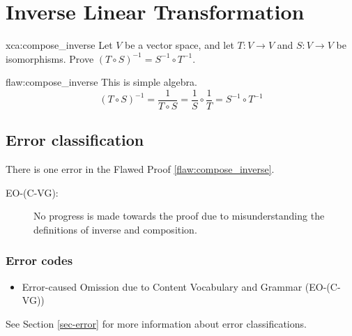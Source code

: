 \section{Inverse Linear Transformation}

\begin{xca}{xca:compose_inverse}
Let $V$ be a vector space, and let $T: V \to V$ and $S: V \to V$ be isomorphisms. Prove $(T \circ S)^{-1} = S^{-1} \circ T^{-1}$.

\end{xca}

\begin{flaw}{flaw:compose_inverse} %
This is simple algebra.
$$(T\circ S)^{-1} = \frac{1}{T \circ S} = \frac{1}{S} \circ \frac{1}{T} =  S^{-1} \circ T^{-1}$$
\end{flaw}

\clearpage
\subsection{Error classification}


There is one error
 in the Flawed Proof \ref{flaw:compose_inverse}.

 \begin{description}
    \item[EO-(C-VG):] No progress is made towards the proof due to misunderstanding the definitions of inverse and composition.



 	
 \end{description}


\subsubsection{Error codes}
\begin{itemize}
    \item Error-caused Omission due to Content Vocabulary and Grammar (EO-(C-VG))
\end{itemize}
See Section \ref{sec-error} for more information about error classifications.

